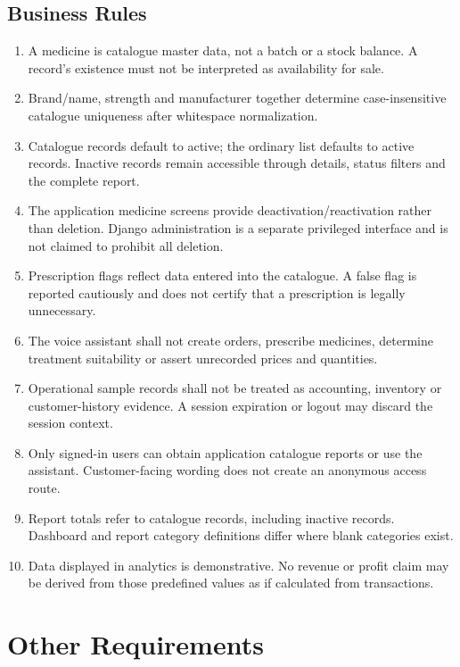 \documentclass[11pt,a4paper]{article}
\begin{document}
\subsection{Business Rules}
\begin{enumerate}[label=BR-\arabic*.,leftmargin=19mm]
\item A medicine is catalogue master data, not a batch or a stock balance. A record's existence must not be interpreted as availability for sale.
\item Brand/name, strength and manufacturer together determine case-insensitive catalogue uniqueness after whitespace normalization.
\item Catalogue records default to active; the ordinary list defaults to active records. Inactive records remain accessible through details, status filters and the complete report.
\item The application medicine screens provide deactivation/reactivation rather than deletion. Django administration is a separate privileged interface and is not claimed to prohibit all deletion.
\item Prescription flags reflect data entered into the catalogue. A false flag is reported cautiously and does not certify that a prescription is legally unnecessary.
\item The voice assistant shall not create orders, prescribe medicines, determine treatment suitability or assert unrecorded prices and quantities.
\item Operational sample records shall not be treated as accounting, inventory or customer-history evidence. A session expiration or logout may discard the session context.
\item Only signed-in users can obtain application catalogue reports or use the assistant. Customer-facing wording does not create an anonymous access route.
\item Report totals refer to catalogue records, including inactive records. Dashboard and report category definitions differ where blank categories exist.
\item Data displayed in analytics is demonstrative. No revenue or profit claim may be derived from those predefined values as if calculated from transactions.
\end{enumerate}

\clearpage
\section{Other Requirements}
\end{document}
